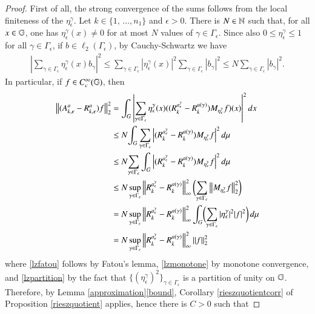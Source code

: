 \documentclass[leqno]{amsart}
\begin{document}
	\begin{proof}
		First of all, the strong convergence of the sums follows from the local finiteness of the $\eta^\gamma_\epsilon$. Let $k\in \{1,\,\dotsc, n_1\}$ and $\epsilon>0$. There is $N\in\mathbb{N}$ such that, for all $x\in\mathbb{G}$, one has $\eta^\gamma_\epsilon(x)\neq 0$ for at most $N$ values of $\gamma\in\Gamma_\epsilon$. Since also $0\leq \eta^\gamma_\epsilon\leq 1$ for all $\gamma\in\Gamma_\epsilon$, if $b\in\ell_2(\Gamma_\epsilon)$, by Cauchy-Schwartz we have
		\begin{align*}
			\left|\sum_{\gamma\in\Gamma_\epsilon}\eta^\gamma_\epsilon(x)b_\gamma\right|^2\leq \sum_{\gamma\in\Gamma_\epsilon}|\eta^\gamma_\epsilon(x)|^2 \sum_{\gamma\in\Gamma_\epsilon}|b_\gamma|^2\leq N\sum_{\gamma\in\Gamma_\epsilon}|b_\gamma|^2.
		\end{align*}
		In particular, if $f\in C_{c}^{\infty}(\mathbb{G})$, then
		\begin{align}
			\nonumber \left\lVert(A^a_{k,\epsilon}-R^a_{k,\epsilon})f\right\rVert_2^2&=\int_G \left|\sum_{\gamma\in\Gamma_\epsilon}\eta^\gamma_\epsilon(x)((R^{a^\gamma_\epsilon}_k-R^{a(\gamma)}_{k}) M_{\eta^\gamma_\epsilon} f)(x)\right|^2d x\\
			\nonumber    &\leq N\!\int_G \sum_{\gamma\in\Gamma_\epsilon}\left|(R^{a^\gamma_\epsilon}_{k}-R^{a(\gamma)}_{k}) M_{\eta^\gamma_\epsilon} f\right|^2d \mu\\
			\label{lzfatou}&\leq N\!\sum_{\gamma\in\Gamma_\epsilon}\int_G \left|(R^{a^\gamma_\epsilon}_{k}-R^{a(\gamma)}_{k}) M_{\eta^\gamma_\epsilon} f\right|^2d\mu\\
			\nonumber&\leq N\sup_{\gamma\in\Gamma_\epsilon}\left\lVert R^{a^\gamma_\epsilon}_{k}-R^{a(\gamma)}_{k}\right\rVert^2_\infty \biggl(\sum_{\gamma\in\Gamma_\epsilon}\left\lVert M_{\eta^\gamma_\epsilon} f\right\rVert_2^2\biggr)\\
			\label{lzmonotone}&=N\sup_{\gamma\in\Gamma_\epsilon}\left\lVert R^{a^\gamma_\epsilon}_{k}-R^{a(\gamma)}_{k}\right\rVert^2_\infty\int_G\biggl(\sum_{\gamma\in\Gamma_\epsilon}|\eta^\gamma_\epsilon|^2 |f|^2\biggr)\,d\mu\\
			\label{lzpartition}&=N\sup_{\gamma\in\Gamma_\epsilon}\left\lVert R^{a^\gamma_\epsilon}_{k}-R^{a(\gamma)}_{k}\right\rVert^2_\infty\left\lVert f\right\rVert_2^2
		\end{align}
		where \eqref{lzfatou} follows by Fatou's lemma, \eqref{lzmonotone} by monotone convergence, and \eqref{lzpartition} by the fact that $\{(\eta^\gamma_\epsilon)^2\}_{\gamma\in\Gamma_\epsilon}$ is a partition of unity on $\mathbb{G}$. Therefore, by Lemma \ref{approximation}\eqref{bound}, Corollary \ref{rieszquotientcorr} of Proposition \ref{rieszquotient} applies, hence there is $C>0$ such that

\end{proof}
\end{document}
